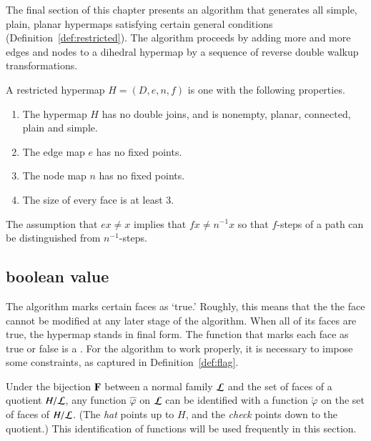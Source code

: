 The final section of this chapter presents an algorithm that generates all
simple, plain, planar hypermaps satisfying certain general conditions
(Definition~\ref{def:restricted}).  The algorithm proceeds by adding more and
more
edges and nodes to a dihedral hypermap by a sequence of reverse double walkup
transformations.

\begin{definition}[restricted]\label{def:restricted}
A restricted hypermap $H = (D,e,n,f)$ is one with the following
properties.
\begin{enumerate}
\item The hypermap $H$ has no double joins, and is nonempty, planar,
  connected, plain and simple.
\item The edge map $e$ has no fixed points.  %
\item The node map $n$ has no fixed points.
\item The size of every face is at least $3$.
\end{enumerate}
%
%
\end{definition}

\begin{remark}
The assumption that $e x \ne x$ implies that $f x \ne n^{-1} x$ so that $f$-steps of a 
path can be distinguished from $n^{-1}$-steps.
\end{remark}


\subsection{boolean value}
%

The algorithm  marks certain faces as `true.'
Roughly, this  means that the the face cannot be modified
at any later stage of the algorithm.   When all of its faces
are true, the hypermap stands in final form.
The function that marks each face as true or false is a
.  For the algorithm to work properly, it is necessary
to impose some constraints, as captured in Definition~\ref{def:flag}.
%


Under the bijection ${\mathbf F}$ between a normal family ${\cal L}$ and the set of
faces of a quotient $H/{\cal L}$, any function $\hat\varphi$ on ${\cal L}$
can be identified with a function $\check\varphi$ on the set of faces of $H/{\cal L}$.
(The {\it hat} points up to $H$, and the {\it check} points down to the quotient.)
This identification of functions will be used frequently in this section.

